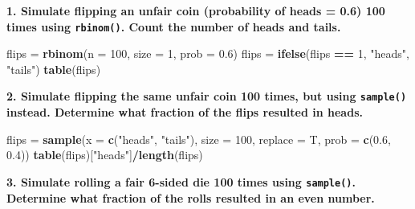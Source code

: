 \documentclass[]{book}
\newenvironment{Shaded}{\begin{snugshade}}{\end{snugshade}}
\newcommand{\KeywordTok}[1]{\textcolor[rgb]{0.13,0.29,0.53}{\textbf{#1}}}
\newcommand{\DataTypeTok}[1]{\textcolor[rgb]{0.13,0.29,0.53}{#1}}
\newcommand{\DecValTok}[1]{\textcolor[rgb]{0.00,0.00,0.81}{#1}}
\newcommand{\FloatTok}[1]{\textcolor[rgb]{0.00,0.00,0.81}{#1}}
\newcommand{\StringTok}[1]{\textcolor[rgb]{0.31,0.60,0.02}{#1}}
\newcommand{\OperatorTok}[1]{\textcolor[rgb]{0.81,0.36,0.00}{\textbf{#1}}}
\newcommand{\NormalTok}[1]{#1}
\theoremstyle{definition}
\theoremstyle{definition}
\theoremstyle{definition}
\theoremstyle{remark}
\begin{document}
\textbf{1. Simulate flipping an unfair coin (probability of heads = 0.6)
100 times using \texttt{rbinom()}. Count the number of heads and tails.}

\begin{Shaded}
\begin{Highlighting}[]
\NormalTok{flips =}\StringTok{ }\KeywordTok{rbinom}\NormalTok{(}\DataTypeTok{n =} \DecValTok{100}\NormalTok{, }\DataTypeTok{size =} \DecValTok{1}\NormalTok{, }\DataTypeTok{prob =} \FloatTok{0.6}\NormalTok{)}
\NormalTok{flips =}\StringTok{ }\KeywordTok{ifelse}\NormalTok{(flips }\OperatorTok{==}\StringTok{ }\DecValTok{1}\NormalTok{, }\StringTok{"heads"}\NormalTok{, }\StringTok{"tails"}\NormalTok{)}
\KeywordTok{table}\NormalTok{(flips)}
\end{Highlighting}
\end{Shaded}

\textbf{2. Simulate flipping the same unfair coin 100 times, but using
\texttt{sample()} instead. Determine what fraction of the flips resulted
in heads.}

\begin{Shaded}
\begin{Highlighting}[]
\NormalTok{flips =}\StringTok{ }\KeywordTok{sample}\NormalTok{(}\DataTypeTok{x =} \KeywordTok{c}\NormalTok{(}\StringTok{"heads"}\NormalTok{, }\StringTok{"tails"}\NormalTok{), }\DataTypeTok{size =} \DecValTok{100}\NormalTok{, }\DataTypeTok{replace =}\NormalTok{ T, }\DataTypeTok{prob =} \KeywordTok{c}\NormalTok{(}\FloatTok{0.6}\NormalTok{, }\FloatTok{0.4}\NormalTok{))}
\KeywordTok{table}\NormalTok{(flips)[}\StringTok{"heads"}\NormalTok{]}\OperatorTok{/}\KeywordTok{length}\NormalTok{(flips)}
\end{Highlighting}
\end{Shaded}

\textbf{3. Simulate rolling a fair 6-sided die 100 times using
\texttt{sample()}. Determine what fraction of the rolls resulted in an
even number.}

\begin{Shaded}
\end{Shaded}
\end{document}
